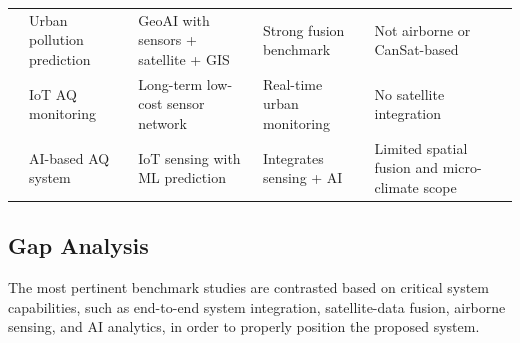 \documentclass[conference]{IEEEtran}
\begin{document}
\begin{table}[!t]
\begin{tabularx}{\textwidth}{|c|p{3cm}|p{3.2cm}|p{3.5cm}|X|}
\cite{R18} & Urban pollution prediction & GeoAI with sensors + satellite + GIS & Strong fusion benchmark & Not airborne or CanSat-based \\

\cite{R21} & IoT AQ monitoring & Long-term low-cost sensor network & Real-time urban monitoring & No satellite integration \\

\cite{R22} & AI-based AQ system & IoT sensing with ML prediction & Integrates sensing + AI & Limited spatial fusion and micro-climate scope \\

\hline
\end{tabularx}
\end{table}

\subsection{Gap Analysis}

The most pertinent benchmark studies are contrasted based on critical system capabilities, such as end-to-end system integration, satellite-data fusion, airborne sensing, and AI analytics, in order to properly position the proposed system.

\begin{table}[!t]
\centering
\footnotesize
\caption{Benchmark Comparative Analysis}
\label{tab:benchmark_analysis}
\renewcommand{\arraystretch}{1.25}
\setlength{\tabcolsep}{3pt}

\end{table}
\end{document}
